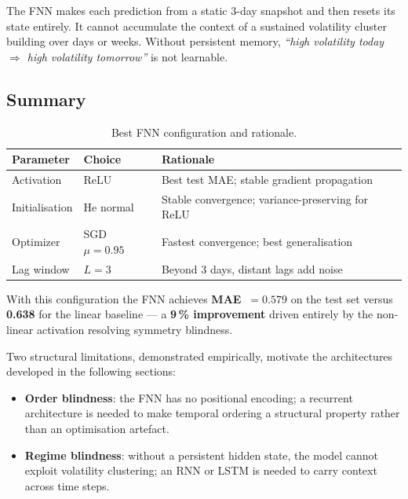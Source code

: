 The FNN makes each prediction from a static 3-day snapshot and then resets its
state entirely. It cannot accumulate the context of a sustained volatility
cluster building over days or weeks. Without persistent memory,
\emph{``high volatility today $\Rightarrow$ high volatility tomorrow''}
is not learnable.

\subsection{Summary}

\begin{table}[H]
  \centering
  \caption{Best FNN configuration and rationale.}
  \label{tab:fnn_best}
  \begin{tabular}{lll}
    \toprule
    Parameter & Choice & Rationale \\
    \midrule
    Activation    & ReLU              & Best test MAE; stable gradient propagation \\
    Initialisation & He normal        & Stable convergence; variance-preserving for ReLU \\
    Optimizer     & SGD $\mu=0.95$    & Fastest convergence; best generalisation \\
    Lag window    & $L=3$             & Beyond 3 days, distant lags add noise \\
    \bottomrule
  \end{tabular}
\end{table}

With this configuration the FNN achieves \textbf{MAE~$=0.579$} on the test set
versus \textbf{0.638} for the linear baseline --- a \textbf{9\,\% improvement}
driven entirely by the non-linear activation resolving symmetry blindness.

Two structural limitations, demonstrated empirically, motivate the architectures
developed in the following sections:
\begin{itemize}
  \item \textbf{Order blindness}: the FNN has no positional encoding; a
        recurrent architecture is needed to make temporal ordering a structural
        property rather than an optimisation artefact.
  \item \textbf{Regime blindness}: without a persistent hidden state, the model
        cannot exploit volatility clustering; an RNN or LSTM is needed to carry
        context across time steps.
\end{itemize}
